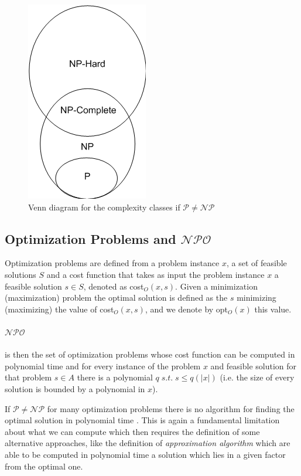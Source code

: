 
\begin{figure}
	\centering
	\includegraphics[width=0.3\linewidth]{tex/img/complexity-diagram.png}
	\caption{Venn diagram for the complexity classes if $\mathcal{P} \neq
			\mathcal{NP} $ \cite{article}}%
	\label{fig:tex/img/complexity-diagram}
\end{figure}

\subsection{Optimization Problems and $\mathcal{NPO} $}%
\label{sub:optimization_problems}

Optimization problems are defined from a problem instance $x$, a set of
feasible solutions $S$ and a cost function that takes as input the problem
instance $x$ a feasible solution $s \in S$, denoted as cost$_{O} (x, s) $.
Given a minimization (maximization) problem the optimal solution is defined as
the $s$ minimizing (maximizing) the value of cost$_{O} (x, s)$, and we denote
by opt$_{O} (x) $ this value\cite{Trevisan2004}.

\paragraph{$\mathcal{NPO} $}%
\label{par:_npo_}

is then the set of optimization problems whose cost function
can be computed in polynomial time and for every instance of the problem $x$
and feasible solution for that problem $s \in A$ there is a polynomial $q \; s.t.
	\; s \leq q(|x|)$ (i.e. the size of every solution is bounded by a polynomial
in $x$).

If $\mathcal{P} \neq \mathcal{NP} $ for many optimization problems there is no
algorithm for finding the optimal solution in polynomial time
\cite{Trevisan2004}. This is again a fundamental limitation about what we can
compute which then requires the definition of some alternative approaches, like
the definition of \emph{approximation algorithm}
which are able to be computed in polynomial time
a solution which lies in a given factor from the optimal
one\cite{Vazirani2002}.

